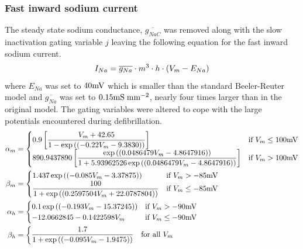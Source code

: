 \subsubsection{Fast inward sodium current}
The steady state sodium conductance, $\overline{g_{NaC}}$ was
removed along with the slow inactivation gating variable $j$ leaving the
following equation for the fast inward sodium current. 
\begin{equation}
  I_{Na}=\overline{g_{Na}}\cdot m^3\cdot h\cdot \left( V_m-E_{Na} \right)
\end{equation}
where $E_{Na}$ was set to $40\mathrm{mV}$ which is smaller than the standard
Beeler-Reuter model and $\overline{g_{Na}}$ was set to $0.15\mathrm{mS}\thickspace\mathrm{mm}^{-2}$,
nearly four times larger than in the original model. The gating variables were
altered to cope with the large potentials encountered during defibrillation.
\begin{gather}
  \label{eqn:brdr_ina_coeffs}
  \begin{aligned}
    \alpha_m &=
    \begin{cases}
      0.9\left[ \dfrac{V_m+42.65}{1-\exp\left( \left( -0.22V_m-9.3830 \right) \right)} \right]
        & \text{if $V_m \le 100\mathrm{mV}$} \\
      890.9437890\left[ \dfrac{\exp\left( \left( 0.0486479V_m-4.8647916 \right) \right)}
        {1+5.93962526\exp\left( \left( 0.0486479V_m-4.8647916 \right) \right)} \right]
        & \text{if $V_m > 100\mathrm{mV}$} 
    \end{cases} \\
    \beta_m &=
    \begin{cases}
      1.437\exp\left( \left( -0.085V_m -3.37875 \right) \right)
        & \text{if $V_m > -85\mathrm{mV}$} \\
      \dfrac{100}{1+\exp\left( \left( 0.2597504V_m+22.0787804 \right) \right)}
        & \text{if $V_m \le -85\mathrm{mV}$} 
    \end{cases} \\
    \alpha_h &=
    \begin{cases}
      0.1\exp\left( \left( -0.193V_m-15.37245 \right) \right)
        & \text{if $V_m > -90\mathrm{mV}$} \\
      -12.0662845-0.1422598V_m
        & \text{if $V_m \le -90\mathrm{mV}$} 
    \end{cases} \\
    \beta_h &=
    \begin{cases}
      \dfrac{1.7}{1+\exp\left( \left( -0.095V_m-1.9475 \right) \right)} 
        & \text{for all $V_m$}
    \end{cases}
  \end{aligned}
\end{gather}
